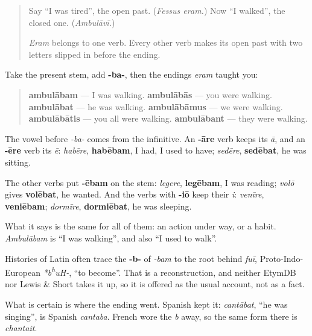 \label{lesson:LA-C281-ambulabam}



\begin{quote}
Say \textquotedblleft{}I was tired\textquotedblright{}, the open past. (\emph{Fessus eram.}) Now \textquotedblleft{}I walked\textquotedblright{}, the closed one. (\emph{Ambulāvī.})

\emph{Eram} belongs to one verb. Every other verb makes its open past with two letters slipped in before the ending.
\end{quote}

\begin{grammarlens}[title={Grammar Lens: -ba- before the ending}]
Take the present stem, add \textbf{-ba-}, then the endings \emph{eram} taught you:

\begin{quote}
\textbf{ambulābam} — I was walking. \textbf{ambulābās} — you were walking. \textbf{ambulābat} — he was walking. \textbf{ambulābāmus} — we were walking. \textbf{ambulābātis} — you all were walking. \textbf{ambulābant} — they were walking.
\end{quote}

The vowel before \emph{-ba-} comes from the infinitive. An \textbf{-āre} verb keeps its \emph{ā}, and an \textbf{-ēre} verb its \emph{ē}: \emph{habēre}, \textbf{habēbam}, I had, I used to have; \emph{sedēre}, \textbf{sedēbat}, he was sitting.

The other verbs put \textbf{-ēbam} on the stem: \emph{legere}, \textbf{legēbam}, I was reading; \emph{volō} gives \textbf{volēbat}, he wanted. And the verbs with \textbf{-iō} keep their \emph{i}: \emph{venīre}, \textbf{veniēbam}; \emph{dormīre}, \textbf{dormiēbat}, he was sleeping.

What it says is the same for all of them: an action under way, or a habit. \emph{Ambulābam} is \textquotedblleft{}I was walking\textquotedblright{}, and also \textquotedblleft{}I used to walk\textquotedblright{}.
\end{grammarlens}

\begin{cousinweb}
Histories of Latin often trace the \textbf{-b-} of \emph{-bam} to the root behind \emph{fuī}, Proto-Indo-European \emph{*b\textsuperscript{h}uH-}, \textquotedblleft{}to become\textquotedblright{}. That is a reconstruction, and neither EtymDB nor Lewis \& Short takes it up, so it is offered as the usual account, not as a fact.

What is certain is where the ending went. Spanish kept it: \emph{cantābat}, \textquotedblleft{}he was singing\textquotedblright{}, is Spanish \emph{cantaba}. French wore the \emph{b} away, so the same form there is \emph{chantait}.
\end{cousinweb}

